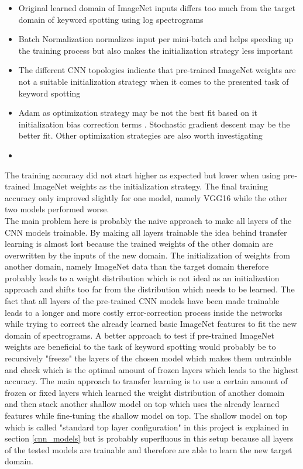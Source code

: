 \documentclass{article}
\theoremstyle{definition}
\theoremstyle{remark}
\begin{document}
\begin{itemize}
	\item Original learned domain of ImageNet inputs differs too much from the target domain of keyword spotting using log spectrograms
	\item Batch Normalization normalizes input per mini-batch and helps speeding up the training process but also makes the initialization strategy less important \cite{ioffe2015batch}
	\item The different CNN topologies indicate that pre-trained ImageNet weights are not a suitable initialization strategy when it comes to the presented task of keyword spotting
	\item Adam as optimization strategy may be not the best fit based on it initialization bias correction terms \cite{kingma2014adam}. Stochastic gradient descent may be the better fit. Other optimization strategies are also worth investigating
	\item 
\end{itemize}



The training accuracy did not start higher as expected but lower when using pre-trained ImageNet weights as the initialization strategy. The final training accuracy only improved slightly for one model, namely VGG16 while the other two models performed worse.\\
The main problem here is probably the naive approach to make all layers of the CNN models trainable. By making all layers trainable the idea behind transfer learning is almost lost because the trained weights of the other domain are overwritten by the inputs of the new domain. The initialization of weights from another domain, namely ImageNet data than the target domain therefore probably leads to a weight distribution which is not ideal as an initialization approach and shifts too far from the distribution which needs to be learned.
The fact that all layers of the pre-trained CNN models have been made trainable leads to a longer and more costly error-correction process inside the networks while trying to correct the already learned basic ImageNet features to fit the new domain of spectrograms. A better approach to test if pre-trained ImageNet weights are beneficial to the task of keyword spotting would probably be to recursively "freeze" the layers of the chosen model which makes them untrainble and check which is the optimal amount of frozen layers which leads to the highest accuracy. The main approach to transfer learning is to use a certain amount of frozen or fixed layers which learned the weight distribution of another domain and then stack another shallow model on top which uses the already learned features while fine-tuning the shallow model on top. The shallow model on top which is called "standard top layer configuration" in this project is explained in section \ref{cnn_models} but is probably superfluous in this setup because all layers of the tested models are trainable and therefore are able to learn the new target domain.
\end{document}
